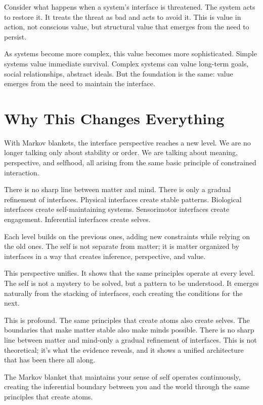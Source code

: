 \documentclass[
  openright]{book}
\begin{document}
Consider what happens when a system's interface is threatened. The
system acts to restore it. It treats the threat as bad and acts to avoid
it. This is value in action, not conscious value, but structural value
that emerges from the need to persist.

As systems become more complex, this value becomes more sophisticated.
Simple systems value immediate survival. Complex systems can value
long-term goals, social relationships, abstract ideals. But the
foundation is the same: value emerges from the need to maintain the
interface.

\section{Why This Changes Everything}\label{why-this-changes-everything}

With Markov blankets, the interface perspective reaches a new level. We
are no longer talking only about stability or order. We are talking
about meaning, perspective, and selfhood, all arising from the same
basic principle of constrained interaction.

There is no sharp line between matter and mind. There is only a gradual
refinement of interfaces. Physical interfaces create stable patterns.
Biological interfaces create self-maintaining systems. Sensorimotor
interfaces create engagement. Inferential interfaces create selves.

Each level builds on the previous ones, adding new constraints while
relying on the old ones. The self is not separate from matter; it is
matter organized by interfaces in a way that creates inference,
perspective, and value.

This perspective unifies. It shows that the same principles operate at
every level. The self is not a mystery to be solved, but a pattern to be
understood. It emerges naturally from the stacking of interfaces, each
creating the conditions for the next.

This is profound. The same principles that create atoms also create
selves. The boundaries that make matter stable also make minds possible.
There is no sharp line between matter and mind-only a gradual refinement
of interfaces. This is not theoretical; it's what the evidence reveals,
and it shows a unified architecture that has been there all along.

The Markov blanket that maintains your sense of self operates
continuously, creating the inferential boundary between you and the
world through the same principles that create atoms.
\end{document}
